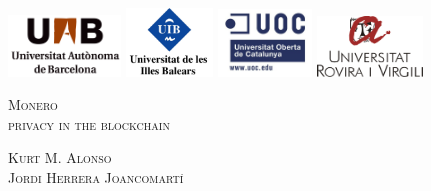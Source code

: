 \documentclass[a4paper,11pt,english,oneside,onecolumn,final,openany]{report}
\begin{document}

\pagestyle{plain}
\thispagestyle{empty}

\mbox{}
\vspace{1cm}
\begin{center}
  \includegraphics[width=3cm]{front/figures/logo_uab.jpg}
  \hspace{0.5cm}
  \includegraphics[width=2.3cm]{front/figures/logo_uib.jpg}
  \hspace{0.5cm}
  \includegraphics[width=2.5cm]{front/figures/logo_uoc.jpg}
  \hspace{0.5cm}
  \includegraphics[width=2.8cm]{front/figures/logo_urv.jpg}
\end{center}


\vfill{}
{\par\centering \textsc{\LARGE Monero \\privacy in the blockchain}\par}
\bigskip
{\par\centering \textsc{\large Kurt M. Alonso \\ Jordi Herrera Joancomartí }\par}
\vfill{}

\begin{center}
  \begin{minipage}[t]{0.8\columnwidth}
 
  
  
  \end{minipage}
\end{center}
\end{document}
